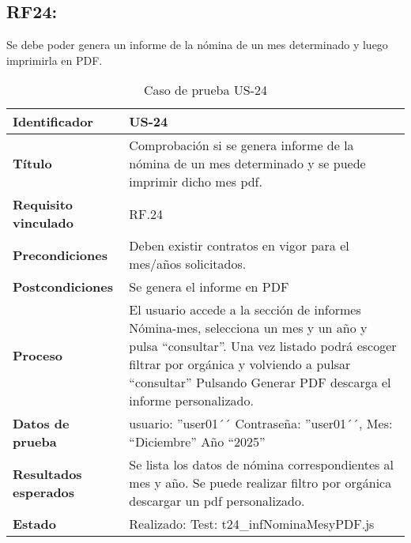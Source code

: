 \subsection{RF24:} Se debe poder genera un informe de la nómina de un mes determinado y luego imprimirla en PDF.
\begin{table}[H]
	\centering
	\renewcommand{\arraystretch}{1.3} 
	\begin{tabularx}{\textwidth}{|l|X|}
		\hline
		\textbf{Identificador} & US-24 \\
		\hline
		\textbf{Título} &Comprobación si se genera informe de la nómina de un mes determinado y se puede imprimir dicho mes pdf.	\\
		\hline
		\textbf{Requisito vinculado} & RF.24 \\
		\hline
		\textbf{Precondiciones} & Deben existir contratos en vigor para el mes/años solicitados.\\
		\hline
		\textbf{Postcondiciones} & Se genera el informe en PDF \\
		\hline
		\textbf{Proceso} & El usuario accede a la sección de informes Nómina-mes, selecciona un mes y un año y pulsa “consultar”. 	Una vez listado podrá escoger filtrar por orgánica y volviendo a pulsar “consultar”
		Pulsando Generar PDF descarga el informe personalizado.
		 \\
		\hline
		\textbf{Datos de prueba} & usuario: ''user01´´ Contraseña: ''user01´´, Mes: “Diciembre” Año “2025” \\
		\hline
		\textbf{Resultados esperados} & Se lista los datos de nómina correspondientes al mes y año. Se puede realizar filtro por orgánica descargar un pdf personalizado. \\
		\hline
		\textbf{Estado} & Realizado: Test: t24\_infNominaMesyPDF.js \\
		\hline
	\end{tabularx}
	\caption{Caso de prueba US-24}
	\label{tab:caso_uso24}
\end{table}

